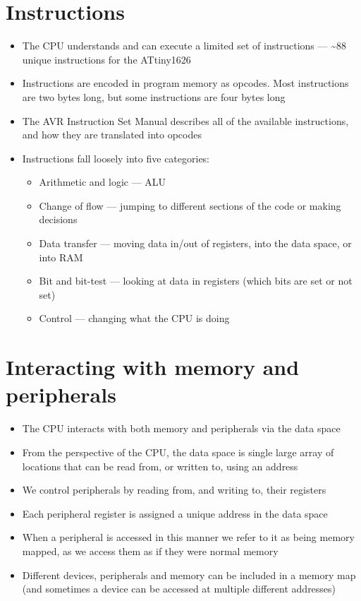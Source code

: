 \documentclass[a4paper]{report}
\begin{document}
\section{Instructions}
\begin{itemize}
    \item The CPU understands and can execute a limited set of
          instructions --- \textasciitilde88 unique instructions for
          the ATtiny1626
    \item Instructions are encoded in program memory as opcodes. Most
          instructions are two bytes long, but some instructions are
          four bytes long
    \item The AVR Instruction Set Manual describes all of the available
          instructions, and how they are translated into opcodes
    \item Instructions fall loosely into five categories:
          \begin{itemize}
              \item Arithmetic and logic --- ALU
              \item Change of flow --- jumping to different sections of
                    the code or making decisions
              \item Data transfer --- moving data in/out of registers,
                    into the data space, or into RAM
              \item Bit and bit-test --- looking at data in registers
                    (which bits are set or not set)
              \item Control --- changing what the CPU is doing
          \end{itemize}
\end{itemize}
\section{Interacting with memory and peripherals}
\begin{itemize}
    \item The CPU interacts with both memory and peripherals via the
          data space
    \item From the perspective of the CPU, the data space is single
          large array of locations that can be read from, or written
          to, using an address
    \item We control peripherals by reading from, and writing to, their
          registers
    \item Each peripheral register is assigned a unique address in the
          data space
    \item When a peripheral is accessed in this manner we refer to it
          as being memory mapped, as we access them as if they were
          normal memory
    \item Different devices, peripherals and memory can be included in
          a memory map (and sometimes a device can be accessed at
          multiple different addresses)
\end{itemize}
\end{document}
